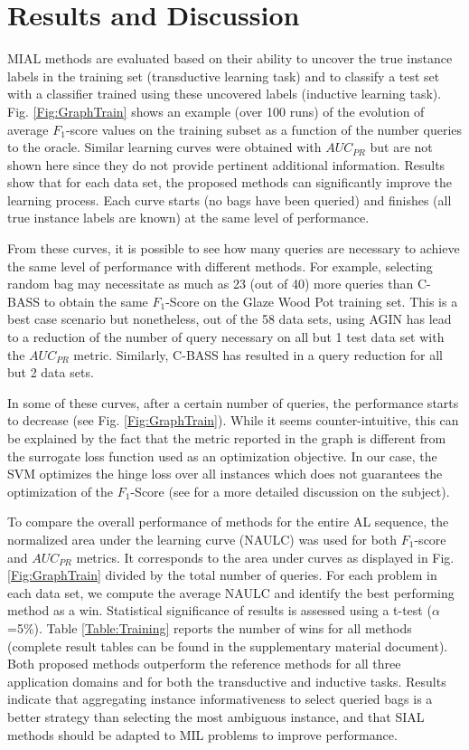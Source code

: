 \documentclass{article}
\begin{document}
\section{Results and Discussion}
\label{Section:Results}

MIAL methods are evaluated based on their ability to uncover the true instance labels in the training set (transductive learning task) and to classify a test set with a classifier trained using these uncovered labels (inductive learning task). Fig. \ref{Fig:GraphTrain} shows an example (over 100 runs) of the evolution of average $F_1$-score values on the training subset as a function of the number queries to the oracle. Similar learning curves were obtained with $AUC_{PR}$ but are not shown here since they do not provide pertinent additional information. Results show that for each data set, the proposed methods can significantly improve the learning process. Each curve starts (no bags have been queried) and finishes (all true instance labels are known) at the same level of performance.  

From these curves, it is possible to see how many queries are necessary to achieve the same level of performance with different methods. For example, selecting random bag may necessitate as much as 23 (out of 40) more queries than C-BASS to obtain the same $F_1$-Score on the Glaze Wood Pot training set. This is a best case scenario but nonetheless, out of the 58 data sets, using AGIN has lead to a reduction of the number of query necessary on all but 1 test data set with the $AUC_{PR}$ metric. Similarly, C-BASS has resulted in a query reduction for all but 2 data sets. 


In some of these curves, after a certain number of queries, the performance starts to decrease (see Fig. \ref{Fig:GraphTrain}). While it seems counter-intuitive, this can be explained by the fact that the metric reported in the graph is different from the surrogate loss function used as an optimization objective. In our case, the SVM optimizes the hinge loss over all instances which does not guarantees the optimization of the $F_1$-Score (see \cite{Loog2012Dipping,Loog2017Meas} for a more detailed discussion on the subject). 

To compare the overall performance of methods for the entire AL sequence, the normalized area under the learning curve (NAULC) was used for both $F_1$-score and $AUC_{PR}$ metrics. It corresponds to the area under curves as displayed in Fig. \ref{Fig:GraphTrain} divided by the total number of queries. For each problem in each data set, we compute the average NAULC and identify the best performing method as a win. Statistical significance of results is assessed using a t-test ($\alpha$=5\%). Table \ref{Table:Training} reports the number of wins for all methods (complete result tables can be found in the supplementary material document). Both proposed methods outperform the reference methods for all three application domains and for both the transductive and inductive tasks. Results indicate that aggregating instance informativeness to select queried bags is a better strategy than selecting the most ambiguous instance, and that SIAL methods should be adapted to MIL problems to improve performance.  
\end{document}

